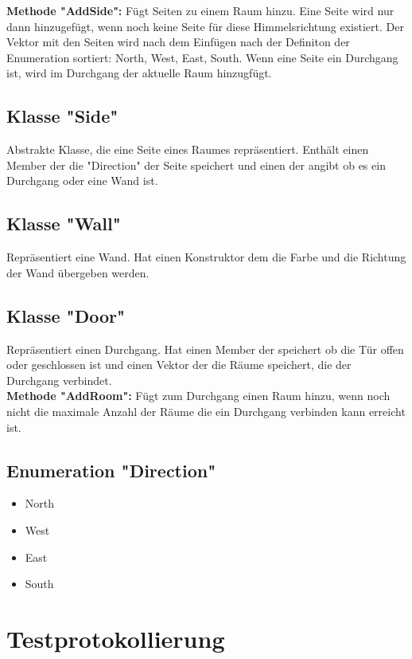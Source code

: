 \documentclass[12pt,a4paper]{article}
\begin{document}
\textbf {Methode "AddSide":}
Fügt Seiten zu einem Raum hinzu. Eine Seite wird nur dann hinzugefügt, wenn noch keine Seite für diese Himmelsrichtung existiert. Der Vektor mit den Seiten wird nach dem Einfügen nach der Definiton der Enumeration sortiert: North, West, East, South. Wenn eine Seite ein Durchgang ist, wird im Durchgang der aktuelle Raum hinzugfügt. \\

\subsection {Klasse "Side"} 
Abstrakte Klasse, die eine Seite eines Raumes repräsentiert. Enthält einen Member der die "Direction" der Seite speichert und einen der angibt ob es ein Durchgang oder eine Wand ist. \\

\subsection {Klasse "Wall"} 
Repräsentiert eine Wand. Hat einen Konstruktor dem die Farbe und die Richtung der Wand übergeben werden. \\

\subsection {Klasse "Door"} 
Repräsentiert einen Durchgang. Hat einen Member der speichert ob die Tür offen oder geschlossen ist und einen Vektor der die Räume speichert, die der Durchgang verbindet. \\

\textbf {Methode "AddRoom":}
Fügt zum Durchgang einen Raum hinzu, wenn noch nicht die maximale Anzahl der Räume die ein Durchgang verbinden kann erreicht ist.

\subsection {Enumeration "Direction"}
\begin {itemize}
	\item North
	\item West
	\item East
	\item South
\end {itemize}


\newpage
\section {Testprotokollierung} 
\end{document}

